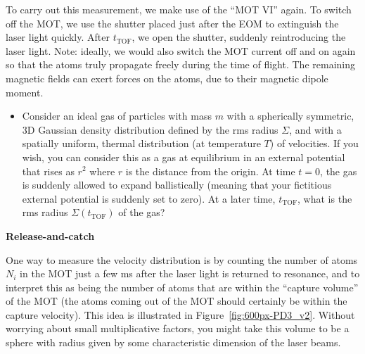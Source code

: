 \documentclass{../lab}
\begin{document}
To carry out this measurement, we make use of the ``MOT VI'' again. To switch off the MOT, we use the shutter placed just after the EOM to extinguish the laser light quickly. After $t_\text{TOF}$, we open the shutter, suddenly reintroducing the laser light. Note: ideally, we would also switch the MOT current off and on again so that the atoms truly propagate freely during the time of flight. The remaining magnetic fields can exert forces on the atoms, due to their magnetic dipole moment.

\begin{itemize}
    \item Consider an ideal gas of particles with mass $m$ with a spherically symmetric, 3D Gaussian density distribution defined by the rms radius $\Sigma$, and with a spatially uniform, thermal distribution (at temperature $T$) of velocities. If you wish, you can consider this as a gas at equilibrium in an external potential that rises as $r^2$ where $r$ is the distance from the origin. At time $t = 0$, the gas is suddenly allowed to expand ballistically (meaning that your fictitious external potential is suddenly set to zero). At a later time, $t_\text{TOF}$, what is the rms radius $\Sigma(t_\text{TOF})$ of the gas?
\end{itemize}

\textbf{Release-and-catch}

One way to measure the velocity distribution is by counting the number of atoms $N_i$ in the MOT just a few ms after the laser light is returned to resonance, and to interpret this as being the number of atoms that are within the ``capture volume'' of the MOT (the atoms coming out of the MOT should certainly be within the capture velocity). This idea is illustrated in Figure~\ref{fig:600px-PD3_v2}. Without worrying about small multiplicative factors, you might take this volume to be a sphere with radius given by some characteristic dimension of the laser beams.
\end{document}
